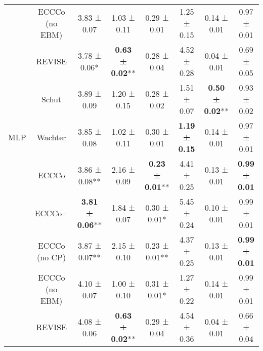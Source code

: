 \begin{table}
{\begin{tabular}[t]{cccccccc}
 & ECCCo (no EBM) & 3.83 ± 0.07\hphantom{*}\hphantom{*} & 1.03 ± 0.11\hphantom{*}\hphantom{*} & 0.29 ± 0.01\hphantom{*}\hphantom{*} & 1.25 ± 0.15\hphantom{*}\hphantom{*} & 0.14 ± 0.01\hphantom{*}\hphantom{*} & 0.97 ± 0.01\hphantom{*}\hphantom{*}\\

 & REVISE & 3.78 ± 0.06*\hphantom{*} & \textbf{0.63 ± 0.02}** & 0.28 ± 0.04\hphantom{*}\hphantom{*} & 4.52 ± 0.28\hphantom{*}\hphantom{*} & 0.04 ± 0.01\hphantom{*}\hphantom{*} & 0.69 ± 0.05\hphantom{*}\hphantom{*}\\

 & Schut & 3.89 ± 0.09\hphantom{*}\hphantom{*} & 1.20 ± 0.15\hphantom{*}\hphantom{*} & 0.28 ± 0.02\hphantom{*}\hphantom{*} & 1.51 ± 0.07\hphantom{*}\hphantom{*} & \textbf{0.50 ± 0.02}** & 0.93 ± 0.02\hphantom{*}\hphantom{*}\\

\multirow[t]{-7}{*}{\centering\arraybackslash MLP} & Wachter & 3.85 ± 0.08\hphantom{*}\hphantom{*} & 1.02 ± 0.11\hphantom{*}\hphantom{*} & 0.30 ± 0.01\hphantom{*}\hphantom{*} & \textbf{1.19 ± 0.15}\hphantom{*}\hphantom{*} & 0.14 ± 0.01\hphantom{*}\hphantom{*} & 0.97 ± 0.01\hphantom{*}\hphantom{*}\\
\cmidrule{1-8}
 & ECCCo & 3.86 ± 0.08** & 2.16 ± 0.09\hphantom{*}\hphantom{*} & \textbf{0.23 ± 0.01}** & 4.41 ± 0.25\hphantom{*}\hphantom{*} & 0.13 ± 0.01\hphantom{*}\hphantom{*} & \textbf{0.99 ± 0.01}\hphantom{*}\hphantom{*}\\

 & ECCCo+ & \textbf{3.81 ± 0.06}** & 1.84 ± 0.07\hphantom{*}\hphantom{*} & 0.30 ± 0.01*\hphantom{*} & 5.45 ± 0.24\hphantom{*}\hphantom{*} & 0.10 ± 0.01\hphantom{*}\hphantom{*} & 0.99 ± 0.01\hphantom{*}\hphantom{*}\\

 & ECCCo (no CP) & 3.87 ± 0.07** & 2.15 ± 0.10\hphantom{*}\hphantom{*} & 0.23 ± 0.01** & 4.37 ± 0.25\hphantom{*}\hphantom{*} & 0.13 ± 0.01\hphantom{*}\hphantom{*} & \textbf{0.99 ± 0.01}\hphantom{*}\hphantom{*}\\

 & ECCCo (no EBM) & 4.10 ± 0.07\hphantom{*}\hphantom{*} & 1.00 ± 0.10\hphantom{*}\hphantom{*} & 0.31 ± 0.01*\hphantom{*} & 1.27 ± 0.22\hphantom{*}\hphantom{*} & 0.14 ± 0.01\hphantom{*}\hphantom{*} & 0.99 ± 0.01\hphantom{*}\hphantom{*}\\

 & REVISE & 4.08 ± 0.06\hphantom{*}\hphantom{*} & \textbf{0.63 ± 0.02}** & 0.29 ± 0.04\hphantom{*}\hphantom{*} & 4.54 ± 0.36\hphantom{*}\hphantom{*} & 0.04 ± 0.01\hphantom{*}\hphantom{*} & 0.66 ± 0.04\hphantom{*}\hphantom{*}\\


\end{tabular}}
\end{table}
